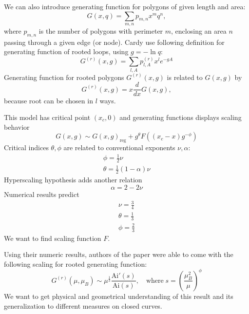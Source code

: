 \documentclass[12pt]{article}
\begin{document}
We can also introduce generating function for polygons of given length and area:
\begin{equation}
  \label{eq:75}
  G(x,q)=\sum_{m,n} p_{m,n} x^{m} q^{n},
\end{equation}
where $p_{m,n}$ is the number of polygons with perimeter $m$, enclosing an area $n$ passing through
a given edge (or node). 
Cardy \cite{cardy2001exact} use following definition for generating function of rooted loops, using
$g=-\ln q$:
\begin{equation}
  \label{eq:76}
  G^{(r)}(x,g)=\sum_{l,A} p_{l,A}^{(r)} x^{l} e^{-gA}
\end{equation}
Generating function for rooted polygons $G^{(r)}(x,g)$ is related to $G(x,g)$ by
\begin{equation}
  \label{eq:81}
  G^{(r)}(x,g)=x \frac{d}{dx} G(x,g),
\end{equation}
because root can be chosen in $l$ ways. 


This model has critical point $(x_{c},0)$ and generating functions displays scaling behavior
\begin{equation}
  \label{eq:77}
  G(x,g)\sim G(x,g)_{\mathrm{reg}}+g^{\theta} F\left((x_{c}-x)g^{-\phi}\right)
\end{equation}
Critical indices $\theta,\phi$ are related to conventional exponents $\nu,\alpha$:
\begin{eqnarray}
  \label{eq:78}
  \phi=\frac{1}{2}\nu\\
  \theta=\frac{1}{2}(1-\alpha) \nu
\end{eqnarray}
Hyperscaling hypothesis adds another relation
\begin{equation}
  \label{eq:79}
  \alpha=2-2\nu
\end{equation}
Numerical results predict
\begin{eqnarray}
  \label{eq:80}
  \nu=\frac{3}{4}\\
  \theta=\frac{1}{3}\\
  \phi=\frac{2}{3}
\end{eqnarray}
We want to find scaling function $F$.

Using their numeric results, authors of the paper \cite{richard2001scaling} were able to come with
the following scaling for rooted generating function:
\begin{equation}
  \label{eq:112}
  G^{(r)}(\mu,\mu_B)\sim \mu^{\frac{1}{3}} \frac{\mathrm{Ai}'(s)}{\mathrm{Ai}(s)},\quad \mbox{where}\; s=\left(\frac{\mu_{B}^{2}}{\mu}\right)^{\phi}
\end{equation}
We want to get physical and geometrical understanding of this result and its generalization to
different measures on closed curves.
\end{document}
